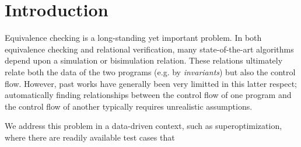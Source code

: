 \section{Introduction}

Equivalence checking is a long-standing yet important problem.  In both
equivalence checking and relational verification, many state-of-the-art
algorithms depend upon a simulation or bisimulation relation.  These relations
ultimately relate both the data of the two programs (e.g. by \emph{invariants})
but also the control flow.  However, past works have generally been very
limitted in this latter respect; automatically finding relationships between
the control flow of one program and the control flow of another typically
requires unrealistic assumptions.  

We address this problem in a data-driven context, such as superoptimization, where there are readily available test cases that






